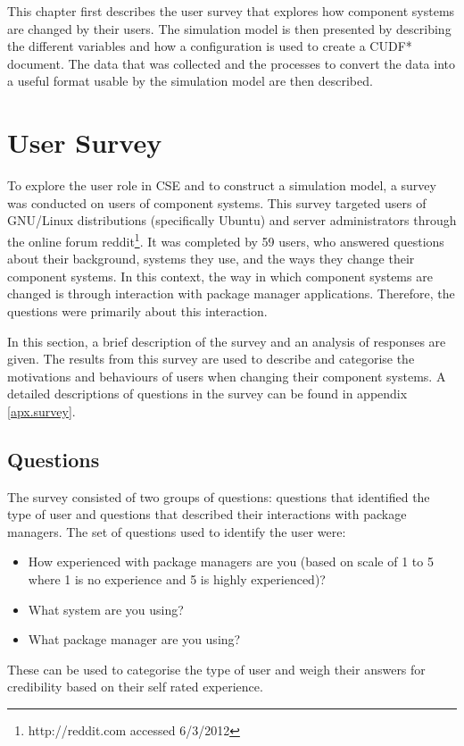 This chapter first describes the user survey that explores how component systems are changed by their users.
The simulation model is then presented by describing the different variables and how a configuration is used to create a CUDF* document.
The data that was collected and the processes to convert the data into a useful format usable by the simulation model are then described.

\section{User Survey}
\label{strat.usersurvey}
To explore the user role in CSE and to construct a simulation model, a survey was conducted on users of component systems.
This survey targeted users of GNU/Linux distributions (specifically Ubuntu) and server administrators through the online forum reddit\footnote{http://reddit.com accessed 6/3/2012}.
It was completed by 59 users, who answered questions about their background, systems they use, and the ways they change their component systems.
In this context, the way in which component systems are changed is through interaction with package manager applications. 
Therefore, the questions were primarily about this interaction.

In this section, a brief description of the survey and an analysis of responses are given.
The results from this survey are used to describe and categorise the motivations and behaviours of users when changing their component systems.
A detailed descriptions of questions in the survey can be found in appendix \ref{apx.survey}. 

\subsection{Questions}
The survey consisted of two groups of questions: questions that identified the type of user and questions that described their interactions with package managers.
The set of questions used to identify the user were:
\begin{itemize}
  \item How experienced with package managers are you (based on scale of 1 to 5 where 1 is no experience and 5 is highly experienced)? 
  \item What system are you using?
  \item What package manager are you using?
\end{itemize}
These can be used to categorise the type of user and weigh their answers for credibility based on their self rated experience.

